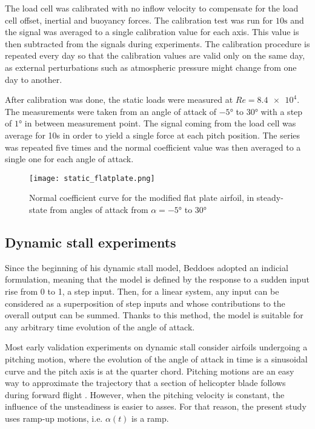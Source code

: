 The load cell was calibrated with no inflow velocity to compensate for the load cell offset, inertial and  buoyancy forces. The calibration test was run for $10 \si{\second}$ and the signal was averaged to a single calibration value for each axis. This value is then subtracted from the signals during experiments. The calibration procedure is repeated every day so that the calibration values are valid only on the same day, as external perturbations such as atmospheric pressure might change from one day to another. 

After calibration was done, the static loads were measured at $Re=\num{8.4e4}$. The measurements were taken from an angle of attack of $\ang{-5}$ to $\ang{30}$ with a step of $\ang{1}$ in between measurement point. The signal coming from the load cell was average for 10s in order to yield a single force at each pitch position. The series was repeated five times and the normal coefficient value was then averaged to a single one for each angle of attack. 

\begin{figure}[h]
	\centering
	\texttt{[image: static\_flatplate.png]}
	\caption{Normal coefficient curve for the modified flat plate airfoil, in steady-state from angles of attack from $\alpha=\ang{-5}$ to $\ang{30}$}
	\label{fig:static_flatplate}
\end{figure}

\subsection{Dynamic stall experiments}

Since the beginning of his dynamic stall model, Beddoes adopted an indicial formulation, meaning that the model is defined by the response to a sudden input rise from 0 to 1, a step input. Then, for a linear system, any input can be considered as a superposition of step inputs and whose contributions to the overall output can be summed. Thanks to this method, the model is suitable for any arbitrary time evolution of the angle of attack.

Most early validation experiments on dynamic stall consider airfoils undergoing a pitching motion, where the evolution of the angle of attack in time is a sinusoidal curve and the pitch axis is at the quarter chord. 
Pitching motions are an easy way to approximate the trajectory that a section of helicopter blade follows during forward flight \cite{mccroskey_dynamic_1972,mulleners_coherent_2010}. 
However, when the pitching velocity is constant, the influence of the unsteadiness is easier to asses. For that reason, the present study uses ramp-up motions, i.e. $\alpha(t)$ is a ramp.

